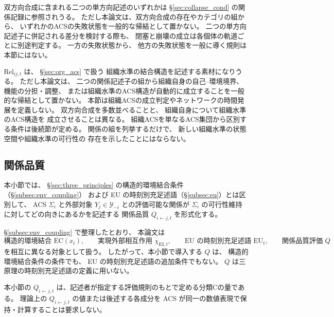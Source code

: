 \begin{remark}
\label{rem:bidirect_to_sec7}
双方向合成に含まれる二つの単方向記述のいずれかは
\S\ref{sec:collapse_cond} の関係記録に参照されうる。
ただし本論文は、双方向合成の存在やカテゴリの組から、
いずれかのACSの失敗状態を一般的な帰結として置かない。
二つの単方向記述子に併記される差分を検討する際も、
閉塞と崩壊の成立は各個体の軌道ごとに別途判定する。
一方の失敗状態から、
他方の失敗状態を一般に導く規則は本節にはない。
\end{remark}

\begin{remark}[組織ACSの節への接続]
\label{rem:bidirect_to_sec8}
$\mathrm{Rel}_{ij,t}$ は、
\S\ref{sec:org_acs} で扱う
組織水準の結合構造を記述する素材になりうる。
ただし本論文は、
二つの関係記述子の組から組織自身の自己--環境境界、
機能の分担・調整、
または組織水準のACS構造が自動的に成立することを一般的な帰結として置かない。
本節は組織ACSの成立判定やネットワークの時間発展を定義しない。
双方向合成を多数並べることと、
組織自身について組織水準のACS構造を
成立させることは異なる。
組織ACSを単なるACS集団から区別する条件は後続節が定める。
関係の組を列挙するだけで、
新しい組織水準の状態空間や組織水準の可行性の
存在を示したことにはならない。
\end{remark}

\subsection{関係品質}
\label{subsec:ro_quality}

本小節では、
\S\ref{sec:three_principles} の構造的環境結合条件（\S\ref{subsec:env_coupling}）
および EU の時刻別充足述語（\S\ref{subsec:eu}）とは区別して、
ACS $\Sigma_i$ と外部対象 $Y_j\in\mathcal Y_{-i}$ との評価可能な関係が
$\Sigma_i$ の可行性維持に対してどの向きにあるかを記述する
関係品質 $Q_{i\leftarrow j,t}$ を形式化する。

\S\ref{subsec:env_coupling} で整理したとおり、
本論文は
\[
  \text{構造的環境結合 } \mathrm{EC}(x_t),
  \qquad
  \text{実現外部相互作用 } \chi_{\mathrm{EI},t},
  \qquad
  \text{EU の時刻別充足述語 } \mathrm{EU}_t,
  \qquad
  \text{関係品質評価 } Q
\]
を相互に異なる対象として扱う。
したがって、本小節で導入する $Q$ は、
構造的環境結合条件の条件でも、
EU の時刻別充足述語の追加条件でもない。
$Q$ は三原理の時刻別充足述語の定義に用いない。


本小節の $Q_{i\leftarrow j,t}$ は、記述者が指定する評価規則のもとで定める分類Cの量である。
理論上の $Q_{i\leftarrow j,t}$ の値または後述する各成分を
ACS が同一の数値表現で保持・計算することは要求しない。

